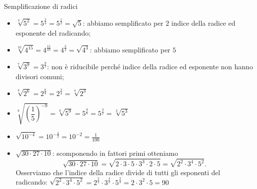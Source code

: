 % 

% 
\begin{esempio}{}{}
Semplificazione di radici
\begin{itemize} [left=0mm]
\item \(\sqrt[4]{5^2}=5^{\frac{2}{4}}=5^{\frac{1}{2}}=\sqrt 5\): 
abbiamo semplificato per \(2\) indice della radice ed esponente del 
radicando;
\item \(\sqrt[10]{4^{15}}=4^{\frac{15}{10}}=4^{\frac{3}{2}}=\sqrt{4^3}\): 
abbiamo semplificato per \(5\)
\item \(\sqrt[7]{3^9}=3^{\frac{9}{7}}\): 
non è riducibile perché indice della radice ed esponente non hanno 
divisori comuni;
\item \(\sqrt[8]{2^6}=2^{\frac{6}{8}}=2^{\frac{3}{4}}=\sqrt[4]{2^3}\)
\item \(\sqrt[6]{\left(\dfrac{1}{5}\right)^{-9}}=\sqrt[6]{5^9}=
      5^{\frac{9}{6}}=5^{\frac{3}{2}}=\sqrt[2]{5^3}\)
\item \(\sqrt{10^{-4}}=10^{-\frac{4}{2}}=10^{-2}=\frac 1{100}\)
\item \(\sqrt{30\cdot 27\cdot 10}\): scomponendo in fattori primi otteniamo 
\[\sqrt{30\cdot 27\cdot 10}=
  \sqrt{2\cdot 3\cdot 5\cdot 3^3\cdot 2\cdot 5}=
  \sqrt{2^2\cdot 3^4\cdot 5^2}.\] 
Osserviamo che l'indice della radice divide di tutti gli 
esponenti del radicando: 
  \(\sqrt{2^2\cdot 3^4\cdot 5^2}=
    2^{\frac{2}{2}} \cdot 3^{\frac{4}{2}} \cdot 5^{\frac{2}{2}}=
    2\cdot 3^2\cdot 5=90\)
\end{itemize}
\end{esempio}

